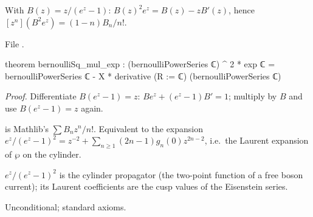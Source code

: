 \begin{theorem}\label{l14:thm:bernsq}
With $B(z) = z/(e^z-1)$: $B(z)^2e^z = B(z) - zB'(z)$, hence $[z^n](B^2e^z) = (1-n)B_n/n!$.
\end{theorem}
\noindent File .
\begin{leancode}
theorem bernoulliSq_mul_exp :
    (bernoulliPowerSeries ℂ) ^ 2 * exp ℂ
      = bernoulliPowerSeries ℂ - X * derivative (R := ℂ) (bernoulliPowerSeries ℂ)
\end{leancode}
\noindent\emph{Proof.} Differentiate $B(e^z-1) = z$: $Be^z + (e^z-1)B' = 1$; multiply by $B$ and use $B(e^z-1) = z$ again.
\begin{dictionary}
 is Mathlib's $\sum B_nz^n/n!$. Equivalent to the expansion $e^z/(e^z-1)^2 =
z^{-2} + \sum_{n\ge1}(2n-1)g_n(0)z^{2n-2}$, i.e.\ the Laurent expansion of $\wp$ on the cylinder.
\end{dictionary}
\begin{physics}
$e^z/(e^z-1)^2$ is the cylinder propagator (the two-point function of a free boson current); its Laurent coefficients are the
cusp values of the Eisenstein series.
\end{physics}
\begin{status}
Unconditional; standard axioms.
\end{status}

